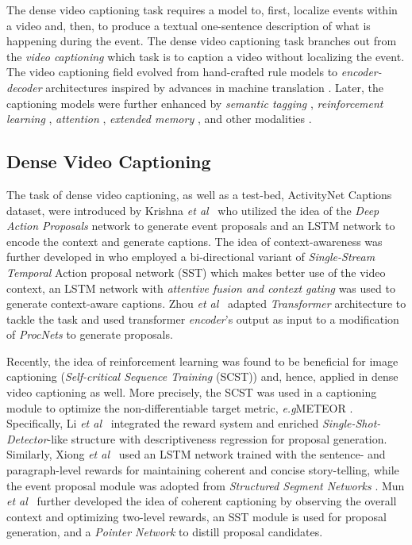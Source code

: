 \documentclass{src/bmvc2k}
\def\eg{\emph{e.g}\bmvaOneDot}
\def\etal{\emph{et al}\bmvaOneDot}
\begin{document}
The dense video captioning task requires a model to, first, localize events within a video and, then, to produce a textual one-sentence description of what is happening during the event. The dense video captioning task branches out from the \textit{video captioning} which task is to caption a video without localizing the event. The video captioning field evolved from hand-crafted rule models \cite{Kojima2002,MunWaiLee2008,Das2013} to \textit{encoder-decoder} architectures \cite{Yao2015,Video2Text_Venugopalan2015,Venugopalan2015b,Yu2016} inspired by advances in machine translation \cite{Rohrbach2013}. Later, the captioning models were further enhanced by \textit{semantic tagging} \cite{Gan2017,Pan2017}, \textit{reinforcement learning} \cite{Wang2018}, \textit{attention} \cite{Yan2019}, \textit{extended memory} \cite{Wang2018a,Pei2019}, and other modalities \cite{Xu2017,Hori2017,Wang2018b,Hao2017}.

\subsection{Dense Video Captioning}

The task of dense video captioning, as well as a test-bed, ActivityNet Captions dataset, were introduced by Krishna \etal~\cite{Krishna2017} who utilized the idea of the \textit{Deep Action Proposals} network \cite{daps_Escorcia2016} to generate event proposals and an LSTM network to encode the context and generate captions. The idea of context-awareness was further developed in \cite{bafcg_Wang2018n} who employed a bi-directional variant of \textit{Single-Stream Temporal} Action proposal network (SST) \cite{SST_Buch2017} which makes better use of the video context, an LSTM network with \textit{attentive fusion and context gating} was used to generate context-aware captions. Zhou \etal~\cite{masked_transformer_Zhou2018} adapted \textit{Transformer} architecture \cite{transformer_Vaswani2017} to tackle the task and used transformer \textit{encoder}'s output as input to a modification of \textit{ProcNets} \cite{ProcNets_2018_Zhou} to generate proposals.

Recently, the idea of reinforcement learning was found to be beneficial for image captioning (\textit{Self-critical Sequence Training} (SCST)) \cite{SCST_Rennie_2017} and, hence, applied in dense video captioning as well. More precisely, the SCST was used in a captioning module to optimize the non-differentiable target metric, \eg METEOR \cite{METEOR_Denkowski2014}. Specifically, Li \etal~\cite{Li2018} integrated the reward system and enriched \textit{Single-Shot-Detector}-like structure \cite{SSD_Liu2016} with descriptiveness regression for proposal generation. Similarly, Xiong \etal~\cite{MFT_Xiong2018} used an LSTM network trained with the sentence- and paragraph-level rewards for maintaining coherent and concise story-telling, while the event proposal module was adopted from \textit{Structured Segment Networks} \cite{Zhao2017}. Mun \etal~\cite{Streamlined_Mun2019} further developed the idea of coherent captioning by observing the overall context and optimizing two-level rewards, an SST module is used for proposal generation, and a \textit{Pointer Network} \cite{PointerNet_Vinyals_2015} to distill proposal candidates.
\end{document}
